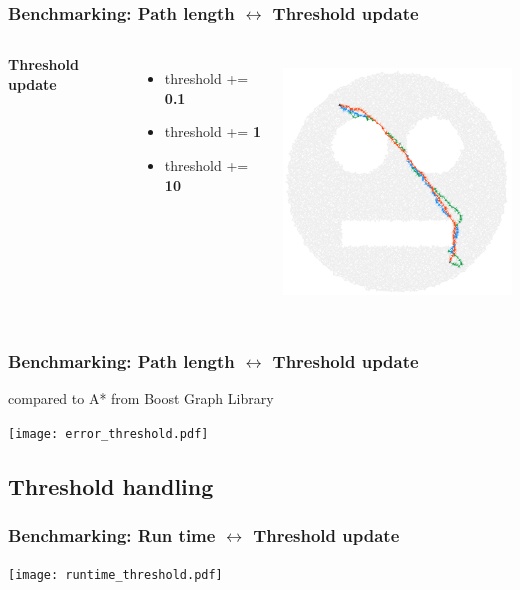\documentclass{beamer}
\begin{document}
\begin{frame}
\frametitle{Benchmarking: Path length $\leftrightarrow$ Threshold update}
\begin{columns}[c] %
\textbf{Threshold update}
\begin{itemize}
\item \textcolor{0.1}{threshold += \textbf{0.1}}
\item \textcolor{1}{threshold += \textbf{1}}
\item \textcolor{10}{threshold += \textbf{10}}
\end{itemize}

\begin{center}
	\includegraphics[height=190pt]{smileygraph.png}
\end{center}
\end{columns}
\end{frame}


\begin{frame}
\frametitle{Benchmarking: Path length $\leftrightarrow$ Threshold update}
compared to A* from Boost Graph Library
\begin{center}
	\texttt{[image: error\_threshold.pdf]}
\end{center}
\end{frame}

\subsection{Threshold handling}
\begin{frame}
\frametitle{Benchmarking: Run time $\leftrightarrow$ Threshold update}
\begin{center}
	\texttt{[image: runtime\_threshold.pdf]}
\end{center}
\end{frame}
\end{document}
